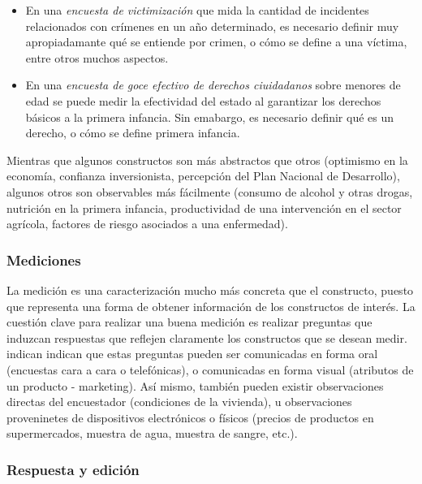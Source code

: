 \documentclass[
  12pt,
  spanish,
]{book}
\providecommand{\tightlist}{%
  \setlength{\itemsep}{0pt}\setlength{\parskip}{0pt}}
\begin{document}
\begin{itemize}
\tightlist
\item
  En una \emph{encuesta de victimización} que mida la cantidad de incidentes relacionados con crímenes en un año determinado, es necesario definir muy apropiadamante qué se entiende por crimen, o cómo se define a una víctima, entre otros muchos aspectos.
\item
  En una \emph{encuesta de goce efectivo de derechos ciuidadanos} sobre menores de edad se puede medir la efectividad del estado al garantizar los derechos básicos a la primera infancia. Sin emabargo, es necesario definir qué es un derecho, o cómo se define primera infancia.
\end{itemize}

Mientras que algunos constructos son más abstractos que otros (optimismo en la economía, confianza inversionista, percepción del Plan Nacional de Desarrollo), algunos otros son observables más fácilmente (consumo de alcohol y otras drogas, nutrición en la primera infancia, productividad de una intervención en el sector agrícola, factores de riesgo asociados a una enfermedad).

\hypertarget{mediciones}{%
\subsubsection{Mediciones}\label{mediciones}}

La medición es una caracterización mucho más concreta que el constructo, puesto que representa una forma de obtener información de los constructos de interés. La cuestión clave para realizar una buena medición es realizar preguntas que induzcan respuestas que reflejen claramente los constructos que se desean medir. \citet{Groves_Fowler_Couper_Lepkowski_Singer_Tourangeau_2009} indican indican que estas preguntas pueden ser comunicadas en forma oral (encuestas cara a cara o telefónicas), o comunicadas en forma visual (atributos de un producto - marketing). Así mismo, también pueden existir observaciones directas del encuestador (condiciones de la vivienda), u observaciones proveninetes de dispositivos electrónicos o físicos (precios de productos en supermercados, muestra de agua, muestra de sangre, etc.).

\hypertarget{respuesta-y-ediciuxf3n}{%
\subsubsection{Respuesta y edición}\label{respuesta-y-ediciuxf3n}}
\end{document}
